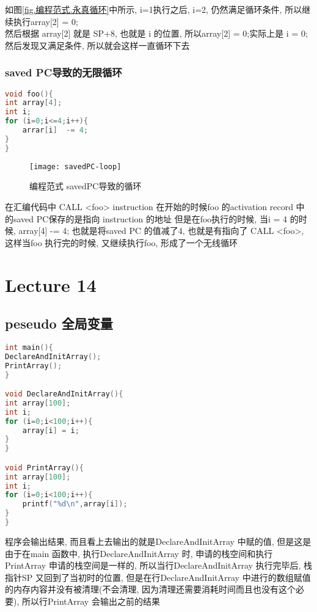 \documentclass{article}
\begin{document}
如图\ref{fig.编程范式.永真循环}中所示, i=1执行之后, i=2, 仍然满足循环条件, 所以继续执行array[2] = 0;\\
然后根据 array[2] 就是 SP+8, 也就是 i 的位置, 所以array[2] = 0;实际上是 i = 0; 然后发现又满足条件, 所以就会这样一直循环下去

\subsubsection{saved PC导致的无限循环}
\begin{lstlisting}[language = C]
void foo(){
int array[4];
int i;
for (i=0;i<=4;i++){
	arrar[i]  -= 4;
}
}
\end{lstlisting}
\begin{figure}[htbp]
	\centering
	\texttt{[image: savedPC-loop]}\\
	\caption{编程范式 savedPC导致的循环}\label{fig.savedPC-loop}
\end{figure}


在汇编代码中
CALL <foo>
instruction
在开始的时候foo 的activation record 中的saved PC保存的是指向 instruction 的地址
但是在foo执行的时候, 当i = 4 的时候, array[4] -= 4; 也就是将saved PC 的值减了4, 也就是有指向了 CALL <foo>, 这样当foo 执行完的时候, 又继续执行foo, 形成了一个无线循环

\section{Lecture 14}
\subsection{peseudo 全局变量}
\begin{lstlisting}[language = C]
int main(){
DeclareAndInitArray();
PrintArray();
}

void DeclareAndInitArray(){
int array[100];
int i;
for (i=0;i<100;i++){
	array[i] = i;
}
}

void PrintArray(){
int array[100];
int i;
for (i=0;i<100;i++){
	printf("%d\n",array[i]);
}
}
\end{lstlisting}
程序会输出结果, 而且看上去输出的就是DeclareAndInitArray 中赋的值, 但是这是由于在main 函数中, 执行DeclareAndInitArray 时, 申请的栈空间和执行PrintArray 申请的栈空间是一样的, 所以当行DeclareAndInitArray 执行完毕后, 栈指针SP 又回到了当初时的位置, 但是在行DeclareAndInitArray 中进行的数组赋值的内存内容并没有被清理(不会清理, 因为清理还需要消耗时间而且也没有这个必要), 所以行PrintArray 会输出之前的结果
\end{document}
